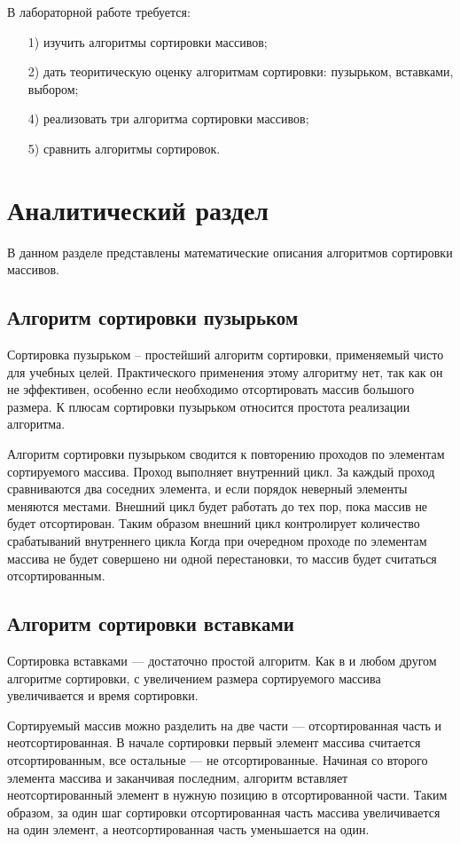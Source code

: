 \documentclass[14pt, a4paper]{extarticle}
\begin{document}
	В лабораторной работе требуется:
	\begin{enumerate}
		\item[1)] изучить алгоритмы сортировки массивов;
		\item[2)] дать теоритическую оценку алгоритмам сортировки: пузырьком, вставками, выбором;
		\item[4)] реализовать три алгоритма сортировки массивов;
		\item[5)] сравнить алгоритмы сортировок.		
	\end{enumerate}

	\clearpage
	\section{Аналитический раздел}
	В данном разделе представлены математические описания алгоритмов сортировки массивов.
	
	\subsection{Алгоритм сортировки пузырьком}
	Сортировка пузырьком – простейший алгоритм сортировки, применяемый чисто для учебных целей. Практического применения этому алгоритму нет, так как он не эффективен, особенно если необходимо отсортировать массив большого размера. К плюсам сортировки пузырьком относится простота реализации алгоритма.
	
	Алгоритм сортировки пузырьком сводится к повторению проходов по элементам сортируемого массива. Проход выполняет внутренний цикл. За каждый проход сравниваются два соседних элемента, и если порядок неверный элементы меняются местами. Внешний цикл будет работать до тех пор, пока массив не будет отсортирован. Таким образом внешний цикл контролирует количество срабатываний внутреннего цикла Когда при очередном проходе по элементам массива не будет совершено ни одной перестановки, то массив будет считаться отсортированным.%
	
	\subsection{Алгоритм сортировки вставками}
	Сортировка вставками — достаточно простой алгоритм. Как в и любом другом алгоритме сортировки, с увеличением размера сортируемого массива увеличивается и время сортировки.
	
	Сортируемый массив можно разделить на две части — отсортированная часть и неотсортированная. В начале сортировки первый элемент массива считается отсортированным, все остальные — не отсортированные. Начиная со второго элемента массива и заканчивая последним, алгоритм вставляет неотсортированный элемент в нужную позицию в отсортированной части. Таким образом, за один шаг сортировки отсортированная часть массива увеличивается на один элемент, а неотсортированная часть уменьшается на один.
	
\end{document}

